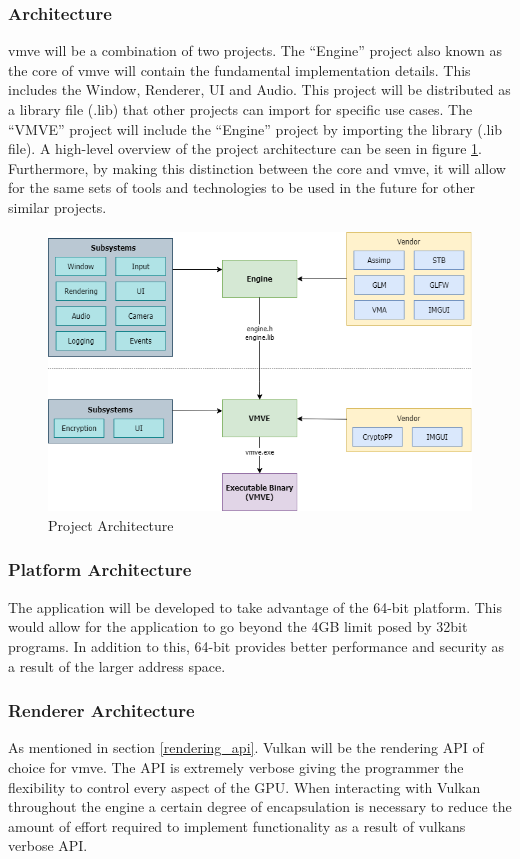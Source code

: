 \documentclass[11pt]{article}
\begin{document}
\subsubsection{Architecture}
\gls*{vmve} will be a combination of two projects. The ``Engine'' project also
known as the core of \gls*{vmve} will contain the fundamental implementation
details. This includes the Window, Renderer, UI and Audio. This project will be
distributed as a library file (.lib) that other projects can import for specific
use cases. The ``VMVE'' project will include the ``Engine'' project by importing
the library (.lib file). A high-level overview of the project architecture can
be seen in figure \ref{fig:projarch}. Furthermore, by making this distinction
between the core and \gls*{vmve}, it will allow for the same sets of tools and
technologies to be used in the future for other similar projects.

\begin{figure}[H]
  \centering
  \includegraphics[width=\textwidth]{images/project_architecture.png}
  \caption{Project Architecture}
  \label{fig:projarch}
\end{figure}

\subsubsection{Platform Architecture}
The application will be developed to take advantage of the 64-bit platform. This
would allow for the application to go beyond the 4GB limit posed by 32bit
programs. In addition to this, 64-bit provides better performance and security
as a result of the larger address space.

\subsubsection{Renderer Architecture}
As mentioned in section \ref{rendering_api}. Vulkan will be the rendering API of
choice for \gls*{vmve}. The API is extremely verbose giving the programmer the
flexibility to control every aspect of the GPU. When interacting with Vulkan
throughout the engine a certain degree of encapsulation is necessary to reduce
the amount of effort required to implement functionality as a result of
\glspl*{vulkan} verbose API.
\end{document}
